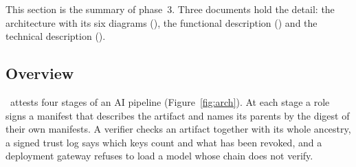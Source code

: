 
This section is the summary of phase~3. Three documents hold the detail: the architecture with its six
diagrams (), the functional description
() and the technical description
().

\subsection{Overview}
\sys\ attests four stages of an AI pipeline (Figure~\ref{fig:arch}). At each stage a role signs a manifest
that describes the artifact and names its parents by the digest of their own manifests. A verifier checks an
artifact together with its whole ancestry, a signed trust log says which keys count and what has been revoked,
and a deployment gateway refuses to load a model whose chain does not verify.

